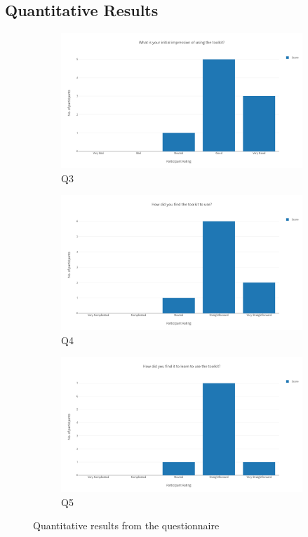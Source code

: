 \documentclass{l4proj}
\begin{document}
\subsection{Quantitative Results}
\label{sec:evlauationquant1}

\begin{figure}[h]
\begin{subfigure}[h]{0.45\linewidth}
\includegraphics[width=\linewidth]{dissertation/eval_1_q3.png}
\caption{Q3}
\end{subfigure}
\hfill
\begin{subfigure}[h]{0.45\linewidth}
\includegraphics[width=\linewidth]{dissertation/eval_1_q4.png}
\caption{Q4}
\end{subfigure}
\hfill
\begin{subfigure}[h]{0.45\linewidth}
\includegraphics[width=\linewidth]{dissertation/eval_1_q5.png}
\caption{Q5}
\end{subfigure}
\hfill
\caption{Quantitative results from the questionnaire}
\end{figure}
\end{document}
